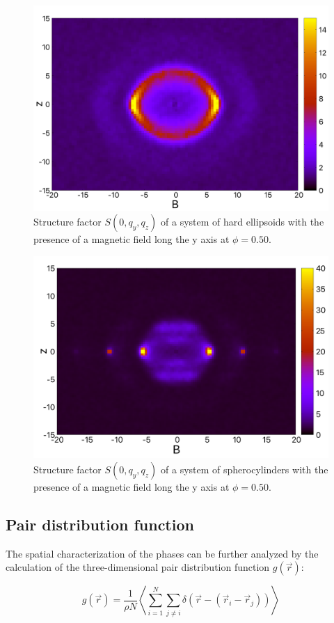 \documentclass[aip,graphicx]{revtex4-1}
\begin{document}
\begin{figure}
    \centering
    \includegraphics[width=0.7\columnwidth]{Syz_B_HE.png}
    \caption{Structure factor $S(0, q_y, q_z)$ of a system of hard ellipsoids with the presence of a magnetic field long the y axis at $\phi=0.50$.}
    \label{fig:Syz_B_HE}
\end{figure}

\begin{figure}
    \centering
    \includegraphics[width=0.7\columnwidth]{Syz_B.png}
    \caption{Structure factor $S(0, q_y, q_z)$ of a system of spherocylinders with the presence of a magnetic field long the y axis at $\phi=0.50$.}
    \label{fig:Syz_B_HSC}
\end{figure}

\subsection{Pair distribution function}

The spatial characterization of the phases can be further analyzed by  the calculation of the three-dimensional pair distribution function $g(\vec{r})$:

\begin{equation}
    g(\vec{r}) = \frac{1}{\rho N} \left\langle \sum_{i=1}^N \sum_{j\neq i} \delta \left( \vec{r} - \left( \vec{r}_i - \vec{r}_j \right) \right) \right\rangle
\end{equation}
\end{document}
